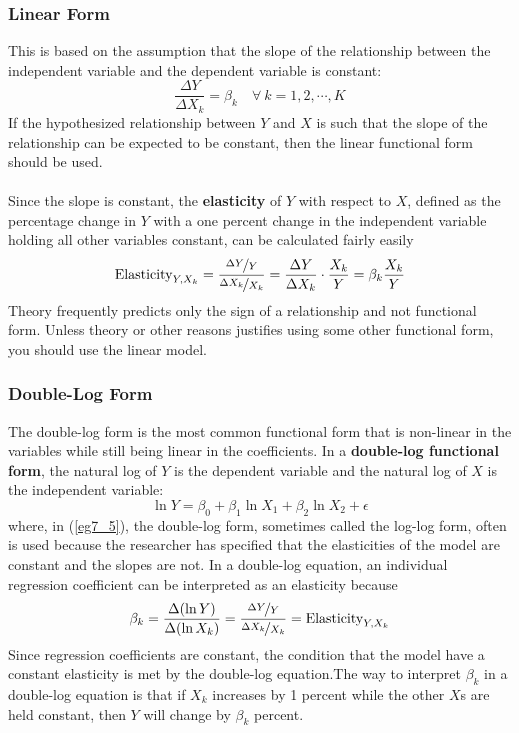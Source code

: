 \documentclass[11pt]{article}
\begin{document}
\subsubsection{Linear Form}
This is based on the assumption that the slope of the relationship between the independent variable and the dependent variable is constant:
$$
\frac{\Delta Y}{\Delta X_k} = \beta_k \quad \forall \> k = 1, 2, \cdots, K
$$
If the hypothesized relationship between $Y$ and $X$ is such that the slope of the relationship can be expected to be constant, then the linear functional form should be used. \\ \\
Since the slope is constant, the \textbf{elasticity} of $Y$ with respect to $X$, defined as the percentage change in $Y$ with a one percent change in the independent variable holding all other variables constant, can be calculated fairly easily
$$
\text{Elasticity}_{Y, X_k} = \frac{\nicefrac{\Delta Y}{Y}}{\nicefrac{\Delta X_k}{X_k}} = \frac{\Delta Y}{\Delta X_k} \cdot \frac{X_k}{Y} = \beta_k \frac{X_k}{Y}
$$
Theory frequently predicts only the sign of a relationship and not functional form. Unless theory or other reasons justifies using some other functional form, you should use the linear model. 
\subsubsection{Double-Log Form}
The double-log form is the most common functional form that is non-linear in the variables while still being linear in the coefficients. In a \textbf{double-log functional form}, the natural log of $Y$ is the dependent variable and the natural log of $X$ is the independent variable:
\begin{equation}
\ln Y = \beta_0 + \beta_{1} \ln X_1 + \beta_2 \ln X_2 + \epsilon \label{eg7_5}
\end{equation}
where, in (\ref{eg7_5}), the double-log form, sometimes called the log-log form, often is used because the researcher has specified that the elasticities of the model are constant and the slopes are not. In a double-log equation, an individual regression coefficient can be interpreted as an elasticity because
\begin{equation}
\beta_k = \frac{\Delta (\ln Y)}{\Delta (\ln X_k)} = \frac{\nicefrac{\Delta Y}{Y}}{\nicefrac{\Delta X_k}{X_k}} = \text{Elasticity}_{Y, X_k}
\end{equation}
Since regression coefficients are constant, the condition that the model have a constant elasticity is met by the double-log equation.The way to interpret $\beta_{k}$ in a double-log equation is that if $X_k$ increases by 1 percent while the other $X$s are held constant, then $Y$ will change by $\beta_k$ percent. 
\end{document}
